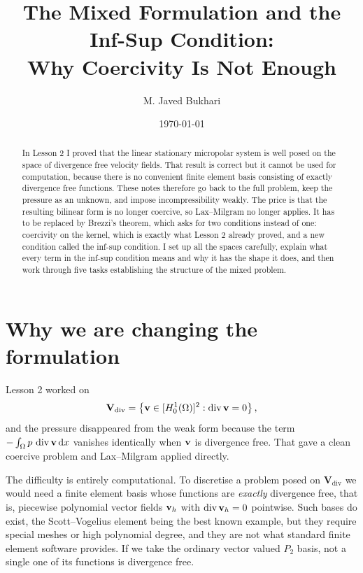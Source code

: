 \documentclass[11pt,a4paper]{article}
\title{The Mixed Formulation and the Inf-Sup Condition:\\
Why Coercivity Is Not Enough}
\author{M. Javed Bukhari}
\date{\today}
\newcommand{\Vdiv}{\mathbf{V}_{\mathrm{div}}}
\begin{document}
\maketitle

\begin{abstract}
In Lesson 2 I proved that the linear stationary micropolar system is well posed
on the space of divergence free velocity fields. That result is correct but it
cannot be used for computation, because there is no convenient finite element
basis consisting of exactly divergence free functions. These notes therefore go
back to the full problem, keep the pressure as an unknown, and impose
incompressibility weakly. The price is that the resulting bilinear form is no
longer coercive, so Lax--Milgram no longer applies. It has to be replaced by
Brezzi's theorem, which asks for two conditions instead of one: coercivity on
the kernel, which is exactly what Lesson 2 already proved, and a new condition
called the inf-sup condition. I set up all the spaces carefully, explain what
every term in the inf-sup condition means and why it has the shape it does, and
then work through five tasks establishing the structure of the mixed problem.
\end{abstract}

\tableofcontents

\section{Why we are changing the formulation}

Lesson 2 worked on
\[
  \Vdiv = \left\{ \bv \in [\Honezero]^{2} : \dive \bv = 0 \right\} ,
\]
and the pressure disappeared from the weak form because the term
$-\int_\Omega p \,\operatorname{div} \mathbf{v} \,\mathrm{d}x$ vanishes identically when $\mathbf{v}$ is divergence
free. That gave a clean coercive problem and Lax--Milgram applied directly.

The difficulty is entirely computational. To discretise a problem posed on
$\Vdiv$ we would need a finite element basis whose functions are
\emph{exactly} divergence free, that is, piecewise polynomial vector fields
$\mathbf{v}_{h}$ with $\operatorname{div} \mathbf{v}_{h} = 0$ pointwise. Such bases do exist, the
Scott--Vogelius element being the best known example, but they require special
meshes or high polynomial degree, and they are not what standard finite element
software provides. If we take the ordinary vector valued $P_{2}$ basis, not a
single one of its functions is divergence free.
\end{document}
